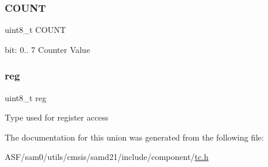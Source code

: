 \subsubsection{\texorpdfstring{COUNT}{COUNT}}
{\footnotesize\ttfamily uint8\+\_\+t C\+O\+U\+NT}

bit\+: 0.. 7 Counter Value \mbox{\label{union_t_c___c_o_u_n_t8___c_o_u_n_t___type_a9428adc9af4653a2050e2536b55dec8d}} 
\subsubsection{\texorpdfstring{reg}{reg}}
{\footnotesize\ttfamily uint8\+\_\+t reg}

Type used for register access 

The documentation for this union was generated from the following file\+:\begin{DoxyCompactItemize}
\item 
A\+S\+F/sam0/utils/cmsis/samd21/include/component/\mbox{\hyperlink{utils_2cmsis_2samd21_2include_2component_2tc_8h}{tc.\+h}}\end{DoxyCompactItemize}
